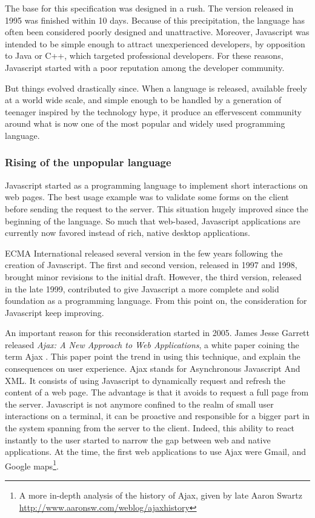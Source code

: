 The base for this specification was designed in a rush. The version released in 1995 was finished within 10 days.
Because of this precipitation, the language has often been considered poorly designed and unattractive.
Moreover, Javascript was intended to be simple enough to attract unexperienced developers, by opposition to Java or C++, which targeted professional developers.
For these reasons, Javascript started with a poor reputation among the developer community.

But things evolved drastically since.
When a language is released, available freely at a world wide scale, and simple enough to be handled by a generation of teenager inspired by the technology hype, it produce an effervescent community around what is now one of the most popular and widely used programming language.

\subsubsection{Rising of the unpopular language}

Javascript started as a programming language to implement short interactions on web pages.
The best usage example was to validate some forms on the client before sending the request to the server.
This situation hugely improved since the beginning of the language.
So much that web-based, Javascript applications are currently now favored instead of rich, native desktop applications.

ECMA International released several version in the few years following the creation of Javascript.
The first and second version, released in 1997 and 1998, brought minor revisions to the initial draft.
However, the third version, released in the late 1999, contributed to give Javascript a more complete and solid foundation as a programming language.
From this point on, the consideration for Javascript keep improving.

An important reason for this reconsideration started in 2005.
James Jesse Garrett released \textit{Ajax: A New Approach to Web Applications}, a white paper coining the term Ajax \cite{Garrett2005}.
This paper point the trend in using this technique, and explain the consequences on user experience.
Ajax stands for Asynchronous Javascript And XML.
It consists of using Javascript to dynamically request and refresh the content of a web page.
The advantage is that it avoids to request a full page from the server.
Javascript is not anymore confined to the realm of small user interactions on a terminal, it can be proactive and responsible for a bigger part in the system spanning from the server to the client.
Indeed, this ability to react instantly to the user started to narrow the gap between web and native applications.
At the time, the first web applications to use Ajax were Gmail, and Google maps\footnote{A more in-depth analysis of the history of Ajax, given by late Aaron Swartz \url{http://www.aaronsw.com/weblog/ajaxhistory}}.

